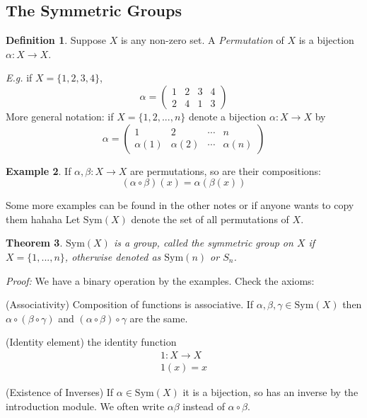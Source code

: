 \documentclass{report}
\makeatletter
\newtheorem{theorem}{Theorem}[subsection]
\theoremstyle{remark}
\theoremstyle{definition}
\newtheorem{definition}[theorem]{Definition}
\theoremstyle{definition}
\newtheorem{example}[theorem]{Example}
\theoremstyle{theorem}
\providecommand{\varitem}{} %
\newenvironment{axioms}[1]
 {\renewcommand\varitem[1]{\item[\textbf{#1\arabic{enumi}\rlap{$##1$}.}]%
    \edef\@currentlabel{#1\arabic{enumi}{$##1$}}}%
  \enumerate[label=\textbf{#1\arabic*.}, ref=#1\arabic*]}
 {\endenumerate}
\makeatother
\begin{document}
\subsection{The Symmetric Groups}
\begin{definition}
Suppose $X$ is any non-zero set. A \emph{Permutation} of $X$ is a bijection $\alpha: X \rightarrow X$.
\end{definition}
\emph{E.g.} if $X=\{1,2,3,4\}$,
\[\alpha=\begin{pmatrix}
1&2&3&4\\
2&4&1&3
\end{pmatrix}\]
More general notation: if $X=\{1,2,...,n\}$ denote a bijection $\alpha: X \rightarrow X$ by
\[\alpha=\begin{pmatrix}
1&2&\cdots&n\\
\alpha(1)&\alpha(2)&\cdots&\alpha(n)
\end{pmatrix}\]
\begin{example}
If $\alpha, \beta: X \rightarrow X$ are permutations, so are their compositions:
\[
    (\alpha \circ \beta)(x)=\alpha(\beta(x))
\]
\end{example}
Some more examples can be found in the other notes or if anyone wants to copy them hahaha
Let $\mathrm{Sym}(X)$ denote the set of all permutations of $X$.
\begin{theorem}
$\mathrm{Sym}(X)$ is a group, called the symmetric group on $X$ if $X=\{1,...,n\}$, otherwise denoted as $\mathrm{Sym}(n)$ or $S_n$.
\end{theorem}
\emph{Proof:} We have a binary operation by the examples. Check the axioms:
\begin{axioms}{G}
    \item (Associativity) Composition of functions is associative. If $\alpha,\beta,\gamma \in \mathrm{Sym}(X)$ then $\alpha \circ (\beta \circ \gamma)$ and $(\alpha \circ \beta) \circ \gamma$ are the same.
    \item (Identity element) the identity function
    \begin{gather*}
        1:X \rightarrow X\\
        1(x)=x
    \end{gather*}
    \item (Existence of Inverses) If $\alpha \in \mathrm{Sym}(X)$ it is a bijection, so has an inverse by the introduction module.
\end{axioms}
We often write $\alpha\beta$ instead of $\alpha \circ \beta$.
\end{document}
